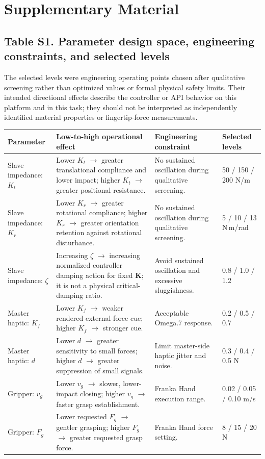 \documentclass[11pt]{article}
\begin{document}
\section*{Supplementary Material}
\subsection*{Table S1. Parameter design space, engineering constraints, and selected levels}
The selected levels were engineering operating points chosen after qualitative screening rather than optimized values or formal physical safety limits. Their intended directional effects describe the controller or API behavior on this platform and in this task; they should not be interpreted as independently identified material properties or fingertip-force measurements.
\small
\renewcommand{\arraystretch}{1.16}
\begin{longtable}{P{0.16\textwidth}P{0.29\textwidth}P{0.27\textwidth}P{0.14\textwidth}}
\toprule
Parameter & Low-to-high operational effect & Engineering constraint & Selected levels \\
\midrule
Slave impedance: $K_t$ & Lower $K_t$ $\rightarrow$ greater translational compliance and lower impact; higher $K_t$ $\rightarrow$ greater positional resistance. & No sustained oscillation during qualitative screening. & 50 / 150 / 200 N/m \\
Slave impedance: $K_r$ & Lower $K_r$ $\rightarrow$ greater rotational compliance; higher $K_r$ $\rightarrow$ greater orientation retention against rotational disturbance. & No sustained oscillation during qualitative screening. & 5 / 10 / 13 N\,m/rad \\
Slave impedance: $\zeta$ & Increasing $\zeta$ $\rightarrow$ increasing normalized controller damping action for fixed $\mathbf{K}$; it is not a physical critical-damping ratio. & Avoid sustained oscillation and excessive sluggishness. & 0.8 / 1.0 / 1.2 \\
Master haptic: $K_f$ & Lower $K_f$ $\rightarrow$ weaker rendered external-force cue; higher $K_f$ $\rightarrow$ stronger cue. & Acceptable Omega.7 response. & 0.2 / 0.5 / 0.7 \\
Master haptic: $d$ & Lower $d$ $\rightarrow$ greater sensitivity to small forces; higher $d$ $\rightarrow$ greater suppression of small signals. & Limit master-side haptic jitter and noise. & 0.3 / 0.4 / 0.5 N \\
Gripper: $v_g$ & Lower $v_g$ $\rightarrow$ slower, lower-impact closing; higher $v_g$ $\rightarrow$ faster grasp establishment. & Franka Hand execution range. & 0.02 / 0.05 / 0.10 m/s \\
Gripper: $F_g$ & Lower requested $F_g$ $\rightarrow$ gentler grasping; higher $F_g$ $\rightarrow$ greater requested grasp force. & Franka Hand force setting. & 8 / 15 / 20 N \\
\bottomrule
\end{longtable}
\normalsize
\end{document}
